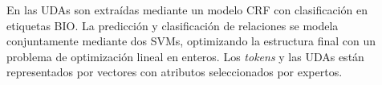 \documentclass[a4paper,11pt,twocolumn,twoside]{article}
\begin{document}

En \cite{stab2017parsing} las UDAs son extraídas mediante un modelo CRF con clasificación en etiquetas BIO.
La predicción y clasificación de relaciones se modela conjuntamente mediante dos SVMs,
optimizando la estructura final con un problema de optimización lineal en enteros. Los \textit{tokens}
y las UDAs están representados por vectores con atributos seleccionados por expertos.


\end{document}
